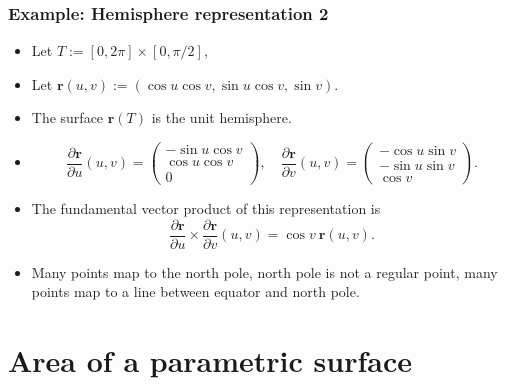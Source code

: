 \documentclass[aspectratio=169]{beamer}
\newcommand{\rr}{\mathbf{r}}
\newcommand{\cover}[1]{{#1}}
\begin{document}
\begin{frame}
    \frametitle{Example: Hemisphere representation 2}


    \begin{itemize}
        \item     Let \( T:= [0,2\pi]\times [0,\pi/2]\),
        \item Let     \(\rr(u,v):= (\cos u \cos v, \sin u \cos v, \sin v)\).
        \item The surface \(\rr(T)\) is the unit hemisphere.
        \item
              \[
                  \frac{\partial \rr}{\partial u}(u,v) = \left(\begin{smallmatrix}
                          -\sin u \cos v \\ \cos u \cos v  \\ 0
                      \end{smallmatrix}\right),
                  \quad
                  \frac{\partial \rr}{\partial v}(u,v) = \left(\begin{smallmatrix}
                          \cover{-\cos u \sin v} \\ \cover{-\sin u \sin v } \\ \cover{\cos v}
                      \end{smallmatrix}\right).
              \]
        \item The fundamental vector product of this representation is
              \[
                  \frac{\partial \rr}{\partial u} \times \frac{\partial \rr}{\partial v}(u,v)
                  = \cover{\cos v }\ \rr(u,v).
              \]
        \item Many points map to the north pole, north pole is not a regular point, many points map to a line between equator and north pole.
    \end{itemize}

\end{frame}

\section{Area of a parametric surface}
\end{document}
